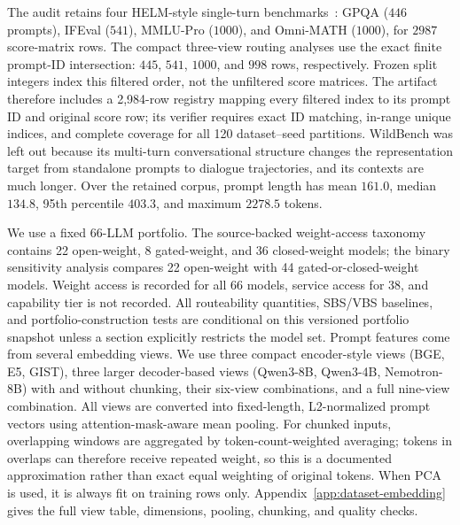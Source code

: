 \documentclass{article}
\newcommand{\sbs}{\textsc{SBS}}
\newcommand{\vbs}{\textsc{VBS}}
\begin{document}
The audit retains four HELM-style single-turn benchmarks~\citep{liang2023helm}: GPQA ($446$ prompts), IFEval ($541$), MMLU-Pro ($1000$), and Omni-MATH ($1000$), for $2987$ score-matrix rows. The compact three-view routing analyses use the exact finite prompt-ID intersection: $445$, $541$, $1000$, and $998$ rows, respectively. Frozen split integers index this filtered order, not the unfiltered score matrices. The artifact therefore includes a 2,984-row registry mapping every filtered index to its prompt ID and original score row; its verifier requires exact ID matching, in-range unique indices, and complete coverage for all 120 dataset--seed partitions. WildBench was left out because its multi-turn conversational structure changes the representation target from standalone prompts to dialogue trajectories, and its contexts are much longer. Over the retained corpus, prompt length has mean $161.0$, median $134.8$, 95th percentile $403.3$, and maximum $2278.5$ tokens.

We use a fixed 66-LLM portfolio. The source-backed weight-access taxonomy contains 22 open-weight, 8 gated-weight, and 36 closed-weight models; the binary sensitivity analysis compares 22 open-weight with 44 gated-or-closed-weight models. Weight access is recorded for all 66 models, service access for 38, and capability tier is not recorded. All routeability quantities, \sbs/\vbs{} baselines, and portfolio-construction tests are conditional on this versioned portfolio snapshot unless a section explicitly restricts the model set. Prompt features come from several embedding views. We use three compact encoder-style views (BGE, E5, GIST), three larger decoder-based views (Qwen3-8B, Qwen3-4B, Nemotron-8B) with and without chunking, their six-view combinations, and a full nine-view combination. All views are converted into fixed-length, L2-normalized prompt vectors using attention-mask-aware mean pooling. For chunked inputs, overlapping windows are aggregated by token-count-weighted averaging; tokens in overlaps can therefore receive repeated weight, so this is a documented approximation rather than exact equal weighting of original tokens. When PCA is used, it is always fit on training rows only. Appendix~\ref{app:dataset-embedding} gives the full view table, dimensions, pooling, chunking, and quality checks.
\end{document}
